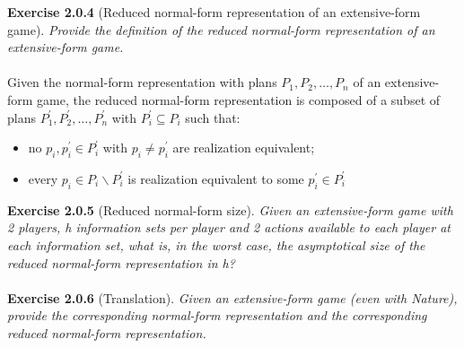 \textbf{Exercise 2.0.4} (Reduced normal-form representation of an extensive-form game). \textit{Provide the definition of
the reduced normal-form representation of an extensive-form game.}\\\\
Given the normal-form representation with plans $ P_{1}, P_{2}, \ldots, P_{n} $ of an extensive-form game, the reduced normal-form representation is composed of a subset of plans $ P_{1}^{\prime}, P_{2}^{\prime}, \ldots, P_{n}^{\prime} $ with $ P_{i}^{\prime} \subseteq P_{i} $ such that:
\begin{itemize}
\item no $ p_{i}, p_{i}^{\prime} \in P_{i}^{\prime} $ with $ p_{i} \neq p_{i}^{\prime} $ are realization equivalent;
\item every $ p_{i} \in P_{i} \backslash P_{i}^{\prime} $ is realization equivalent to some $ p_{i}^{\prime} \in P_{i}^{\prime} $
\end{itemize}
\textbf{Exercise 2.0.5} (Reduced normal-form size). \textit{Given an extensive-form game with 2 players, h information
sets per player and 2 actions available to each player at each information set, what is, in the worst case, the
asymptotical size of the reduced normal-form representation in h?}\\\\
\textbf{Exercise 2.0.6} (Translation). \textit{Given an extensive-form game (even with Nature), provide the corresponding normal-form representation and the corresponding reduced normal-form representation.}
